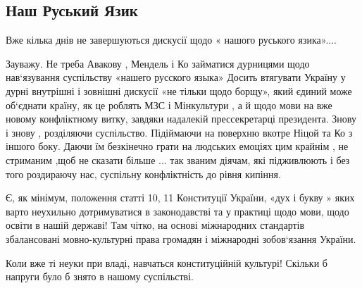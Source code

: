  
 
 
 
 

\subsection{Наш Руський Язик}

Вже кілька днів не завершуються дискусії щодо « нашого руського язика».... 

Зауважу.  Не треба Авакову , Мендель і Ко займатися дурницями щодо
нав‘язування суспільству «нашего русского языка» Досить втягувати Україну  у
дурні внутрішні і зовнішні дискусії «не тільки  щодо борщу», який єдиний може
об‘єднати країну, як це роблять МЗС  і Мінкультури , а й щодо мови на вже
новому конфліктному витку, завдяки надалекій прессекретарці президента.  Знову
і знову , розділяючи суспільство. Підіймаючи на поверхню  вкотре Ніцой та Ко з
іншого боку.  Даючи їм безкінечно грати на людських емоціях цим крайнім , не
стриманим ,щоб не сказати більше ... так званим діячам, які підживлюють і без
того роздираючу нас, суспільну конфліктність до рівня кипіння. 

Є, як мінімум, положення статті  10, 11 Конституції України, «дух і букву »
яких варто неухильно дотримуватися в законодавстві та у практиці щодо мови,
щодо освіти в нашій державі!  Там чітко, на основі міжнародних стандартів
збалансовані мовно-культурні права громадян і міжнародні зобов‘язання України. 

Коли вже ті неуки при владі, навчаться  конституційній культурі! Скільки б
напруги було б знято в нашому суспільстві.

